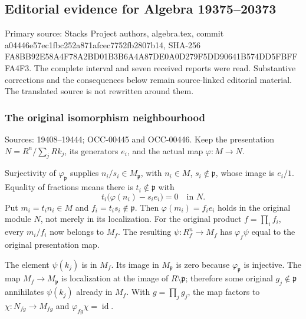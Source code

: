 \subsection{Editorial evidence for Algebra 19375--20373}\label{algebra-proof-010-editorial-evidence-for-algebra-1937520373}

Primary source: Stacks Project authors, algebra.tex, commit a044\allowbreak{}46e5\allowbreak{}7ec1\allowbreak{}fbc2\allowbreak{}52a8\allowbreak{}71af\allowbreak{}cec7\allowbreak{}752f\allowbreak{}b280\allowbreak{}7b14, SHA-256 FA8B\allowbreak{}B92E\allowbreak{}58A4\allowbreak{}F78A\allowbreak{}2BD0\allowbreak{}1B3B\allowbreak{}6A4A\allowbreak{}87DE\allowbreak{}0A0D\allowbreak{}279F\allowbreak{}5DD9\allowbreak{}0641\allowbreak{}B574\allowbreak{}DD5F\allowbreak{}BFFF\allowbreak{}A4F3. The complete interval and seven received reports were read. Substantive corrections and the consequences below remain source-linked editorial material. The translated source is not rewritten around them.

\subsubsection{The original isomorphism neighbourhood}\label{algebra-proof-010-the-original-isomorphism-neighbourhood}

Sources: 19408--19444; OCC-00445 and OCC-00446. Keep the presentation \(N=R^n/\sum_jRk_j\), its generators \(e_i\), and the actual map \(\varphi:M\to N\).

Surjectivity of \(\varphi_{\mathfrak p}\) supplies \(n_i/s_i\in M_{\mathfrak p}\), with \(n_i\in M\), \(s_i\notin\mathfrak p\), whose image is \(e_i/1\). Equality of fractions means there is \(t_i\notin\mathfrak p\) with \[
t_i\bigl(\varphi(n_i)-s_ie_i\bigr)=0\quad\text{in }N.
\] Put \(m_i=t_in_i\in M\) and \(f_i=t_is_i\notin\mathfrak p\). Then \(\varphi(m_i)=f_ie_i\) holds in the original module \(N\), not merely in its localization. For the original product \(f=\prod_i f_i\), every \(m_i/f_i\) now belongs to \(M_f\). The resulting \(\psi:R_f^n\to M_f\) has \(\varphi_f\psi\) equal to the original presentation map.

The element \(\psi(k_j)\) is in \(M_f\). Its image in \(M_{\mathfrak p}\) is zero because \(\varphi_{\mathfrak p}\) is injective. The map \(M_f\to M_{\mathfrak p}\) is localization at the image of \(R\setminus\mathfrak p\); therefore some original \(g_j\notin\mathfrak p\) annihilates \(\psi(k_j)\) already in \(M_f\). With \(g=\prod_jg_j\), the map factors to \(\chi:N_{fg}\to M_{fg}\) and \(\varphi_{fg}\chi=\operatorname{id}\).

